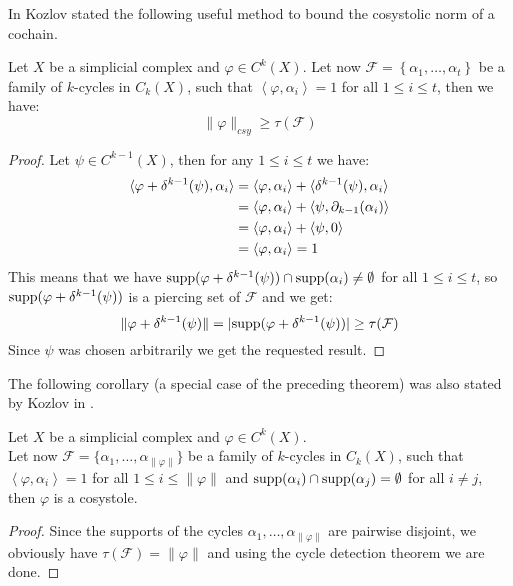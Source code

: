 In \cite{6} Kozlov stated the following useful method to bound the cosystolic norm of a cochain.

\begin{thm}\label{theorem9}
Let \(X\) be a simplicial complex and \(\varphi\in C^k(X)\). Let now \(\mathcal{F}=\left\{\alpha_1,\ldots,\alpha_t\right\}\) be a family of \(k\)-cycles in \(C_k(X)\), such that \(\left\langle\varphi,\alpha_i\right\rangle=1\) for all \(1\leq i\leq t\), then we have:
\[
\|\varphi\|_{csy}\geq\tau(\mathcal{F})
\]
\begin{proof}
Let \(\psi\in C^{k-1}(X)\), then for any \(1\leq i\leq t\) we have:
\begin{align}
\langle\varphi+\delta^{k-1}(\psi),\alpha_i\rangle&=\langle\varphi,\alpha_i\rangle+\langle\delta^{k-1}(\psi),\alpha_i\rangle\notag\\
&=\langle\varphi,\alpha_i\rangle+\langle\psi,\partial_{k-1}(\alpha_i)\rangle\notag\\
&=\langle\varphi,\alpha_i\rangle+\langle\psi,0\rangle\notag\\
&=\langle\varphi,\alpha_i\rangle=1\notag
\end{align}
This means that we have \(\mathrm{supp}(\varphi+\delta^{k-1}(\psi))\cap \mathrm{supp}(\alpha_i)\neq\emptyset\) for all \(1\leq i\leq t\), so \(\mathrm{supp}(\varphi+\delta^{k-1}(\psi))\) is a piercing set of \(\mathcal{F}\) and we get:
\[
\|\varphi+\delta^{k-1}(\psi)\|=|\mathrm{supp}(\varphi+\delta^{k-1}(\psi))|\geq\tau(\mathcal{F})
\]
Since \(\psi\) was chosen arbitrarily we get the requested result.
\end{proof}
\end{thm}

The following corollary (a special case of the preceding theorem) was also stated by Kozlov in \cite{6}.

\begin{cor}
Let \(X\) be a simplicial complex and \(\varphi\in C^k(X)\).\\
Let now \(\mathcal{F}=\{\alpha_1,\ldots,\alpha_{\|\varphi\|}\}\) be a family of \(k\)-cycles in \(C_k(X)\), such that \(\left\langle\varphi,\alpha_i\right\rangle=1\) for all \(1\leq i\leq\|\varphi\|\) and \(\mathrm{supp}(\alpha_i)\cap \mathrm{supp}(\alpha_j)=\emptyset\) for all \(i\neq j\), then \(\varphi\) is a cosystole.
\begin{proof}
Since the supports of the cycles \(\alpha_1,\ldots,\alpha_{\|\varphi\|}\) are pairwise disjoint, we obviously have \(\tau(\mathcal{F})=\|\varphi\|\) and using the cycle detection theorem we are done.
\end{proof}
\end{cor}

